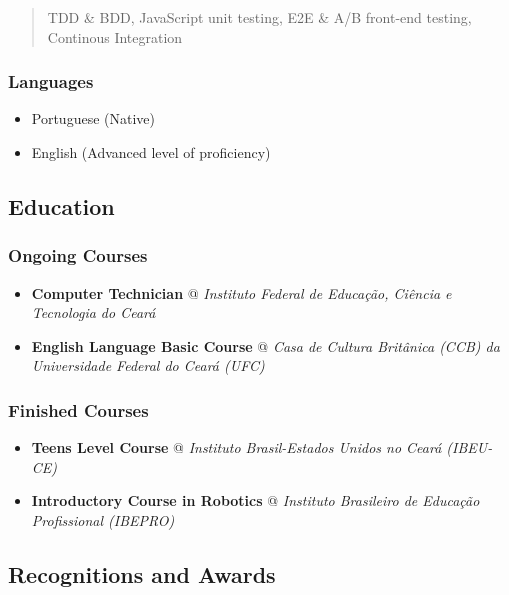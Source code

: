\documentclass[]{article}
\begin{document}
\begin{quote}
TDD \& BDD, JavaScript unit testing, E2E \& A/B front-end testing,
Continous Integration
\end{quote}

\subsubsection{Languages}\label{languages}

\begin{itemize}
\item
  Portuguese (Native)
\item
  English (Advanced level of proficiency)
\end{itemize}

\subsection{Education}\label{education}

\subsubsection{Ongoing Courses}\label{ongoing-courses}

\begin{itemize}
\item
  \textbf{Computer Technician} @ \emph{Instituto Federal de Educação,
  Ciência e Tecnologia do Ceará}
\item
  \textbf{English Language Basic Course} @ \emph{Casa de Cultura
  Britânica (CCB) da Universidade Federal do Ceará (UFC)}
\end{itemize}

\subsubsection{Finished Courses}\label{finished-courses}

\begin{itemize}
\item
  \textbf{Teens Level Course} @ \emph{Instituto Brasil-Estados Unidos no
  Ceará (IBEU-CE)}
\item
  \textbf{Introductory Course in Robotics} @ \emph{Instituto Brasileiro
  de Educação Profissional (IBEPRO)}
\end{itemize}

\subsection{Recognitions and Awards}\label{recognitions-and-awards}
\end{document}
